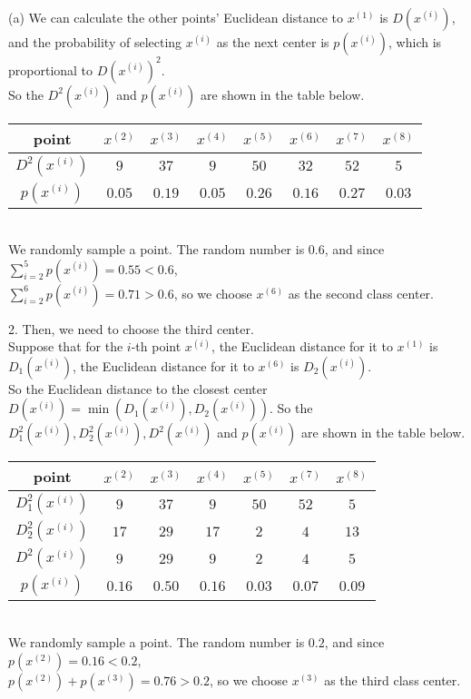 \documentclass[10pt]{article}
\begin{document}
\begin{enumerate}[1.]
(a) We can calculate the other points' Euclidean distance to $x^{(1)}$ is $D(x^{(i)})$, and the probability of selecting $x^{(i)}$ as the next center is $p(x^{(i)})$, 
which is proportional to $D(x^{(i)})^2$.\\
So the $D^2(x^{(i)})$ and $p(x^{(i)})$ are shown in the table below.\\ 
\begin{tabular}{|c|c|c|c|c|c|c|c|}
	\hline
	point & $x^{(2)}$ & $x^{(3)}$ & $x^{(4)}$ & $x^{(5)}$ & $x^{(6)}$ & $x^{(7)}$ & $x^{(8)}$\\
	\hline
	$D^2(x^{(i)})$ & $9$ & $37$ & $9$ & $50$ & $32$ & $52$ & $5$\\
	\hline
	$p(x^{(i)})$ & $0.05$ & $0.19$ & $0.05$ & $0.26$ & $0.16$ & $0.27$ & $0.03$\\
	\hline
\end{tabular}\\
We randomly sample a point. The random number is $0.6$, and since $\sum\limits_{i=2}^5 p(x^{(i)})=0.55<0.6$,\\
$\sum\limits_{i=2}^6 p(x^{(i)})=0.71>0.6$, so we choose $x^{(6)}$ as the second class center.

2. Then, we need to choose the third center.\\
Suppose that for the $i$-th point $x^{(i)}$, the Euclidean distance for it to $x^{(1)}$ is $D_1(x^{(i)})$,
the Euclidean distance for it to $x^{(6)}$ is $D_2(x^{(i)})$.\\
So the Euclidean distance to the closest center $D(x^{(i)})=\min(D_1(x^{(i)}),D_2(x^{(i)}))$.
So the $D_1^2(x^{(i)}),D_2^2(x^{(i)}),D^2(x^{(i)})$ and $p(x^{(i)})$ are shown in the table below.\\ 
\begin{tabular}{|c|c|c|c|c|c|c|}
	\hline
	point & $x^{(2)}$ & $x^{(3)}$ & $x^{(4)}$ & $x^{(5)}$ & $x^{(7)}$ & $x^{(8)}$\\
	\hline
	$D_1^2(x^{(i)})$ & $9$ & $37$ & $9$ & $50$ & $52$ & $5$\\
	\hline
	$D_2^2(x^{(i)})$ & $17$ & $29$ & $17$ & $2$ & $4$ & $13$\\
	\hline
	$D^2(x^{(i)})$ & $9$ & $29$ & $9$ & $2$ & $4$ & $5$\\
	\hline
	$p(x^{(i)})$ & $0.16$ & $0.50$ & $0.16$ & $0.03$ & $0.07$ & $0.09$\\
	\hline
\end{tabular}\\
We randomly sample a point. The random number is $0.2$, and since $p(x^{(2)})=0.16<0.2$,\\
$p(x^{(2)})+p(x^{(3)})=0.76>0.2$, so we choose $x^{(3)}$ as the third class center.


\end{enumerate}
\end{document}
